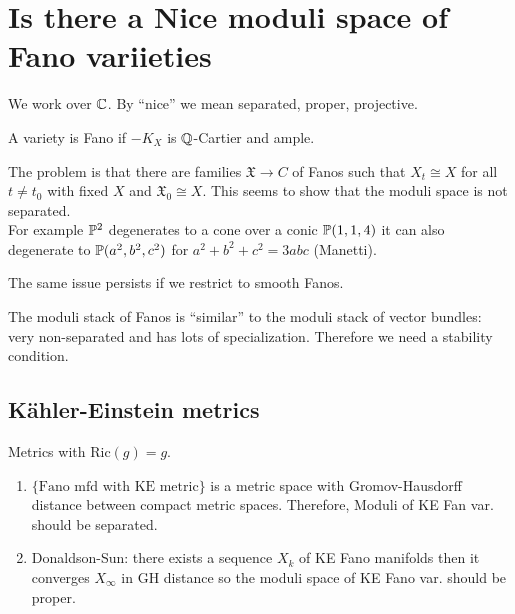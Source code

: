 \documentclass[12pt]{article}
\begin{document}
\section{Is there a Nice moduli space of Fano variieties}

\begin{rmk}
We work over $\CC$. By ``nice'' we mean separated, proper, projective.
\end{rmk}

\begin{defn}
A variety is Fano if $-K_X$ is $\Q$-Cartier and ample.
\end{defn}

\newcommand{\X}{\mathfrak{X}}

\begin{rmk}
The problem is that there are families $\X \to C$ of Fanos such that $X_t \cong X$ for all $t \neq t_0$ with fixed $X$ and $\X_0 \cong X$. This seems to show that the moduli space is not separated.
\bigskip\\
For example $\P^2$ degenerates to a cone over a conic $\P(1,1,4)$ it can also degenerate to $\P(a^2, b^2, c^2)$ for $a^2 + b^2 + c^2 = 3abc$ (Manetti). 
\end{rmk}

\begin{rmk}
The same issue persists if we restrict to smooth Fanos.
\end{rmk}

\begin{rmk}
The moduli stack of Fanos is ``similar'' to the moduli stack of vector bundles: very non-separated and has lots of specialization. Therefore we need a stability condition.
\end{rmk}

\subsection{K\"{a}hler-Einstein metrics}

\newcommand{\Ric}[1]{\mathrm{Ric}\left( #1 \right)}

Metrics with $\Ric{g} = g$. 

\begin{enumerate}
\item $\{ \text{Fano mfd with KE metric} \}$ is a metric space with Gromov-Hausdorff distance between compact metric spaces. Therefore, Moduli of KE Fan var. should be separated.
\item Donaldson-Sun: there exists a sequence $X_k$ of KE Fano manifolds then it converges $X_\infty$ in GH distance so the moduli space of KE Fano var. should be proper.
\end{enumerate}
\end{document}
